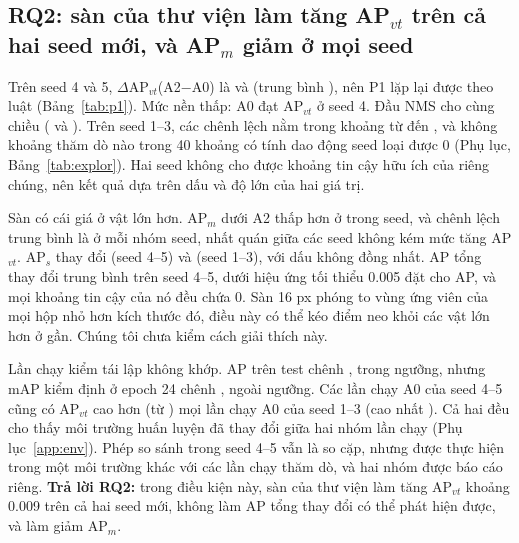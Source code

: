 \documentclass[11pt]{article}
\begin{document}
\subsection{RQ2: sàn của thư viện làm tăng AP$_{vt}$ trên cả hai seed mới, và AP$_m$ giảm ở mọi seed}\label{sec:rq2}
Trên seed 4 và 5, $\Delta$AP$_{vt}$(A2$-$A0) là \pOneSFour{} và \pOneSFive{} (trung bình \pOneMean), nên P1 lặp lại được theo luật
(Bảng~\ref{tab:p1}). Mức nền thấp: A0 đạt AP$_{vt}$ \pOneAzeroSFour{} ở seed 4. Đầu NMS cho cùng chiều (\pOneNmsSFour{} và
\pOneNmsSFive). Trên seed 1--3, các chênh lệch nằm trong khoảng từ \pOneOldMin{} đến \pOneOldMax, và không khoảng thăm dò nào trong
40 khoảng có tính dao động seed loại được 0 (Phụ lục, Bảng~\ref{tab:explor}). Hai seed không cho được khoảng tin cậy hữu ích của
riêng chúng, nên kết quả dựa trên dấu và độ lớn của hai giá trị.

Sàn có cái giá ở vật lớn hơn. AP$_m$ dưới A2 thấp hơn ở \apmNeg{} trong \apmSeeds{} seed, và chênh lệch trung bình là \apmNewMean{} ở
mỗi nhóm seed, nhất quán giữa các seed không kém mức tăng AP$_{vt}$. AP$_s$ thay đổi \apsNewMean{} (seed 4--5) và \apsOldMean{} (seed
1--3), với dấu không đồng nhất. AP tổng thay đổi \apNewMean{} trung bình trên seed 4--5, dưới hiệu ứng tối thiểu 0.005 đặt cho AP,
và mọi khoảng tin cậy của nó đều chứa 0. Sàn 16 px phóng to vùng ứng viên của mọi hộp nhỏ hơn kích thước đó, điều này có thể kéo
điểm neo khỏi các vật lớn hơn ở gần. Chúng tôi chưa kiểm cách giải thích này.

Lần chạy kiểm tái lập không khớp. AP trên test chênh \rzeroDap, trong ngưỡng, nhưng mAP kiểm định ở epoch 24 chênh \rzeroDval,
ngoài ngưỡng. Các lần chạy A0 của seed 4--5 cũng có AP$_{vt}$ cao hơn (từ \aZeroNewMin) mọi lần chạy A0 của seed 1--3 (cao nhất
\aZeroOldMax). Cả hai đều cho thấy môi trường huấn luyện đã thay đổi giữa hai nhóm lần chạy (Phụ lục~\ref{app:env}). Phép so sánh
trong seed 4--5 vẫn là so cặp, nhưng được thực hiện trong một môi trường khác với các lần chạy thăm dò, và hai nhóm được báo cáo
riêng. \textbf{Trả lời RQ2:} trong điều kiện này, sàn của thư viện làm tăng AP$_{vt}$ khoảng 0.009 trên cả hai seed mới, không làm
AP tổng thay đổi có thể phát hiện được, và làm giảm AP$_m$.

\begin{table}[t]\centering\caption{AP trên test theo từng seed, đầu e2e. $\Delta$ là A2 trừ A0. Seed 1--3 đã được xem trước khi
chốt P1; seed 4--5 được huấn luyện sau đó, trong một môi trường khác (Mục~\ref{sec:rq2}).}\label{tab:p1}\scriptsize
\end{table}
\end{document}
